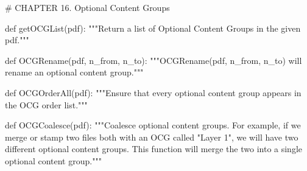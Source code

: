 # CHAPTER 16. Optional Content Groups

def getOCGList(pdf):
    """Return a list of Optional Content Groups in the given pdf."""

def OCGRename(pdf, n_from, n_to):
    """OCGRename(pdf, n_from, n_to) will rename an optional content group."""

def OCGOrderAll(pdf):
    """Ensure that every optional content group appears in the OCG order list."""

def OCGCoalesce(pdf):
    """Coalesce optional content groups. For example, if we merge or stamp two
    files both with an OCG called "Layer 1", we will have two different
    optional content groups. This function will merge the two into a single
    optional content group."""
